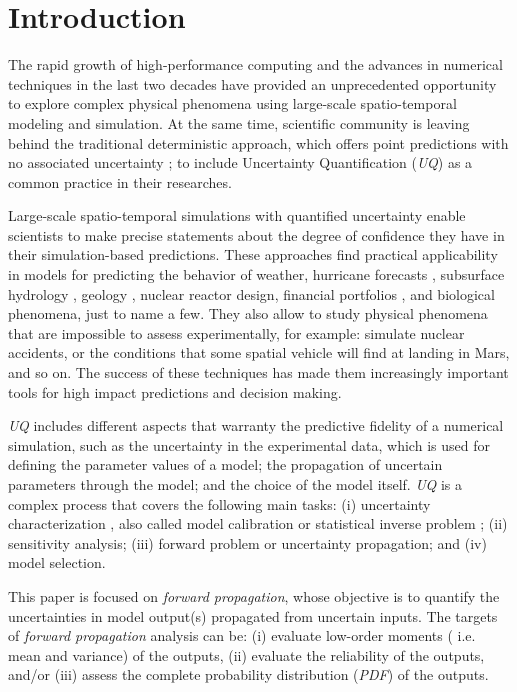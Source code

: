 \chapter[Introduction]{Introduction}\label{cap_intro}
The rapid growth of high-performance computing and the advances in numerical techniques in the last two decades have provided an unprecedented opportunity to explore complex physical phenomena using large-scale spatio-temporal modeling and simulation.  At the same time, scientific community is leaving behind the traditional deterministic approach, which offers  point predictions with no associated uncertainty \cite{Johnstone2015};  to include Uncertainty Quantification (\textit{UQ}) as a common practice in their researches. 

Large-scale spatio-temporal simulations with quantified uncertainty enable scientists to make precise statements about the degree of confidence they have in their simulation-based predictions. These approaches find practical applicability in models for predicting the behavior of weather, hurricane forecasts \cite{Tobergte2013}, subsurface hydrology \cite{Baroni2014a}, geology \cite{Guerra2016}, nuclear reactor design, financial portfolios \cite{Chen2008}, and biological phenomena, just to name a few. They also allow to study physical phenomena that are impossible to assess experimentally, for example: simulate nuclear accidents, or the conditions that some spatial vehicle will find at landing in Mars, and so on. The success of these techniques has made them increasingly important tools for high impact predictions and decision making.

\textit{UQ}  includes different aspects that warranty the predictive fidelity of a numerical simulation, such as the uncertainty in the experimental data, which is used for defining the parameter values of a model; the propagation of uncertain  parameters through the model; and the choice of the model itself. \textit{UQ} is a complex process that covers the following main tasks: (i) uncertainty characterization \cite{Crespo2014}, also called model calibration \cite{Farrell2015a} or statistical inverse problem \cite{Estacio-Hiroms2012};  (ii) sensitivity analysis; (iii) forward problem or uncertainty propagation; and (iv) model selection.

This paper is focused on  \textit{forward propagation}, whose objective is to quantify the uncertainties in model output(s) propagated from uncertain inputs. The targets of \textit{forward propagation} analysis can be: (i) evaluate low-order moments ( i.e. mean and variance) of the outputs, (ii) evaluate the reliability of the outputs, and/or (iii) assess the complete probability distribution (\textit{PDF}) of the outputs.


